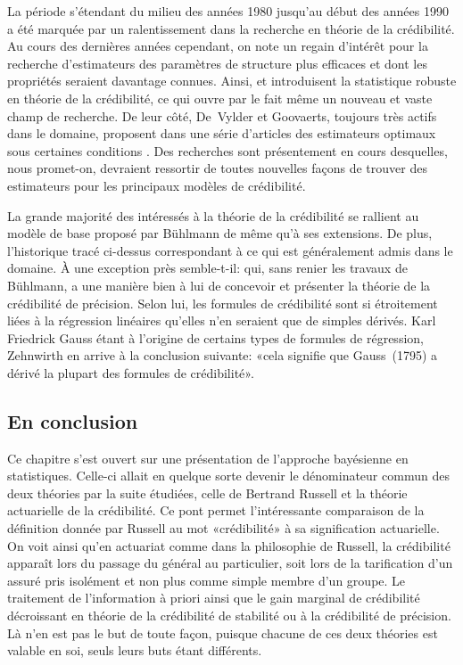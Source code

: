 La période s'étendant du milieu des années 1980 jusqu'au début des
années 1990 a été marquée par un ralentissement dans la recherche en
théorie de la crédibilité. Au cours des dernières années cependant, on
note un regain d'intérêt pour la recherche d'estimateurs des
paramètres de structure plus efficaces et dont les propriétés seraient
davantage connues. Ainsi, \cite{Kunsch:robust:1992} et
\cite{Gisler:robust:1993} introduisent la statistique robuste en
théorie de la crédibilité, ce qui ouvre par le fait même un nouveau et
vaste champ de recherche. De leur côté, De~Vylder et Goovaerts,
toujours très actifs dans le domaine, proposent dans une série
d'articles des estimateurs optimaux sous certaines conditions
\citep{DeVylder:zeroexcess:summary:1991,%
  DeVylder:zeroexcess:classical:1992,%
  DeVylder:zeroexcess:BS:1992}. Des recherches sont présentement en
cours desquelles, nous promet-on, devraient ressortir de toutes
nouvelles façons de trouver des estimateurs pour les principaux
modèles de crédibilité.

La grande majorité des intéressés à la théorie de la crédibilité se
rallient au modèle de base proposé par Bühlmann de même qu'à ses
extensions. De plus, l'historique tracé ci-dessus correspondant à ce
qui est généralement admis dans le domaine. À une exception près
semble-t-il: \cite{Zehnwirth:studyguide:1991} qui, sans renier les
travaux de Bühlmann, a une manière bien à lui de concevoir et
présenter la théorie de la crédibilité de précision. Selon lui, les
formules de crédibilité sont si étroitement liées à la régression
linéaires qu'elles n'en seraient que de simples dérivés. Karl
Friedrick Gauss étant à l'origine de certains types de formules de
régression, Zehnwirth en arrive à la conclusion suivante: «cela
signifie que Gauss~(1795) a dérivé la plupart des formules de
crédibilité».

\subsection{En conclusion}

Ce chapitre s'est ouvert sur une présentation de l'approche bayésienne
en statistiques. Celle-ci allait en quelque sorte devenir le
dénominateur commun des deux théories par la suite étudiées, celle de
Bertrand Russell et la théorie actuarielle de la crédibilité. Ce pont
permet l'intéressante comparaison de la définition donnée par Russell
au mot «crédibilité» à sa signification actuarielle. On voit ainsi
qu'en actuariat comme dans la philosophie de Russell, la crédibilité
apparaît lors du passage du général au particulier, soit lors de la
tarification d'un assuré pris isolément et non plus comme simple
membre d'un groupe. Le traitement de l'information à priori ainsi que
le gain marginal de crédibilité décroissant en théorie de la
crédibilité de stabilité ou à la crédibilité de précision. Là n'en est
pas le but de toute façon, puisque chacune de ces deux théories est
valable en soi, seuls leurs buts étant différents.


